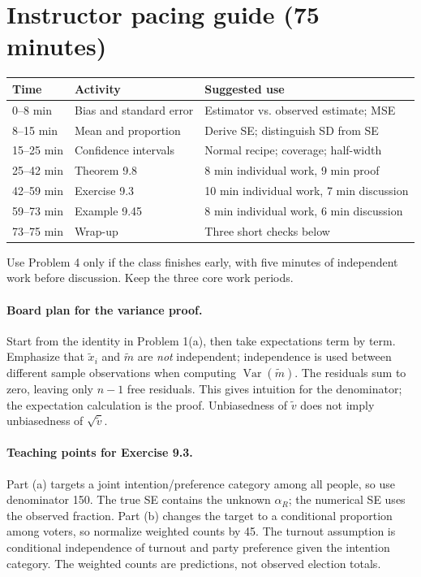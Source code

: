 \documentclass[11pt]{article}
\newcommand{\Var}{\operatorname{Var}}
\newcommand{\rv}[1]{\widetilde{#1}}
\begin{document}
\section*{Instructor pacing guide (75 minutes)}
\begin{center}
\begin{tabular}{@{}lll@{}}
\toprule
Time & Activity & Suggested use\\
\midrule
0--8 min & Bias and standard error & Estimator vs. observed estimate; MSE\\
8--15 min & Mean and proportion & Derive SE; distinguish SD from SE\\
15--25 min & Confidence intervals & Normal recipe; coverage; half-width\\
25--42 min & Theorem 9.8 & 8 min individual work, 9 min proof\\
42--59 min & Exercise 9.3 & 10 min individual work, 7 min discussion\\
59--73 min & Example 9.45 & 8 min individual work, 6 min discussion\\
73--75 min & Wrap-up & Three short checks below\\
\bottomrule
\end{tabular}
\end{center}
Use Problem 4 only if the class finishes early, with five minutes of
independent work before discussion. Keep the three core work periods.

\paragraph{Board plan for the variance proof.}
Start from the identity in Problem 1(a), then take expectations term by
term. Emphasize that $\rv{x}_i$ and $\rv{m}$ are \emph{not} independent;
independence is used between different sample observations when computing
$\Var(\rv{m})$. The residuals sum to zero, leaving only $n-1$ free
residuals. This gives intuition for the denominator; the expectation
calculation is the proof. Unbiasedness of $\rv{v}$ does not imply
unbiasedness of $\sqrt{\rv{v}}$.

\paragraph{Teaching points for Exercise 9.3.}
Part (a) targets a joint intention/preference category among all people,
so use denominator 150. The true SE contains the unknown $\alpha_R$;
the numerical SE uses the observed fraction. Part (b) changes the target
to a conditional proportion among voters, so normalize weighted counts
by 45. The turnout assumption is conditional independence of turnout and
party preference given the intention category. The weighted counts are
predictions, not observed election totals.
\end{document}

